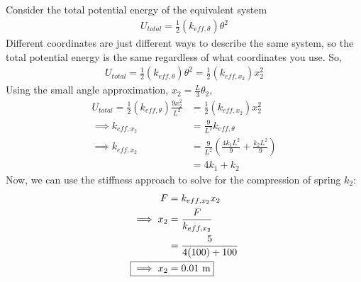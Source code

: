 \subsection{}
Consider the total potential energy of the equivalent system
\begin{align*}
    U_{total} = \frac{1}{2} (k_{eff, \theta}) \theta^2
\end{align*}
Different coordinates are just different ways to describe the same system, so the total potential energy 
is the same regardless of what coordinates you use. So,
\begin{align*}
    U_{total} = \frac{1}{2} (k_{eff, \theta}) \theta^2 = \frac{1}{2} (k_{eff, x_2}) x_2^2
\end{align*}
Using the small angle approximation, $x_2 = \frac{L}{3} \theta_2$, 
\begin{align*}
    U_{total} = \frac{1}{2} (k_{eff, \theta}) \frac{9x_2^2}{L^2} &= \frac{1}{2} (k_{eff, x_2}) x_2^2 \\
    \implies k_{eff, x_2} &= \frac{9}{L^2} k_{eff, \theta} \\
    \implies k_{eff, x_2} &= \frac{9}{L^2} \left(\frac{4 k_1 L^2}{9} + \frac{k_2 L^2}{9}\right) \\
    &= 4k_1 + k_2
\end{align*}
Now, we can use the stiffness approach to solve for the compression of spring $k_2$:
\begin{align*}
    F &= k_{eff, x_2} x_2 \\
    \implies x_2 &= \frac{F}{k_{eff, x_2}} \\
    &= \frac{5}{4(100) + 100} \\
    \Aboxed{\implies x_2 &= 0.01 \text{ m}}
\end{align*}